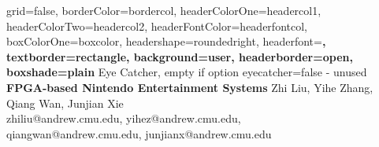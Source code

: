 \documentclass[fpga_paper,portrait]{baposter}
\begin{document}
\begin{poster}{
	grid=false,
	borderColor=bordercol,
	headerColorOne=headercol1,
	headerColorTwo=headercol2,
	headerFontColor=headerfontcol,
	boxColorOne=boxcolor,
	headershape=roundedright,
	headerfont=\Large\sf\bf,
	textborder=rectangle,
	background=user,
	headerborder=open,
  boxshade=plain
}
{
	Eye Catcher, empty if option eyecatcher=false - unused
}
{\huge\sf\bf
	FPGA-based Nintendo Entertainment Systems
}
{
	\vspace{1em} Zhi Liu, Yihe Zhang, Qiang Wan, Junjian Xie\\
	{\smaller zhiliu@andrew.cmu.edu, yihez@andrew.cmu.edu, \\qiangwan@andrew.cmu.edu, junjianx@andrew.cmu.edu}
}
{
\setlength\fboxsep{0pt}
\setlength\fboxrule{0.5pt}
}


\end{poster}
\end{document}
